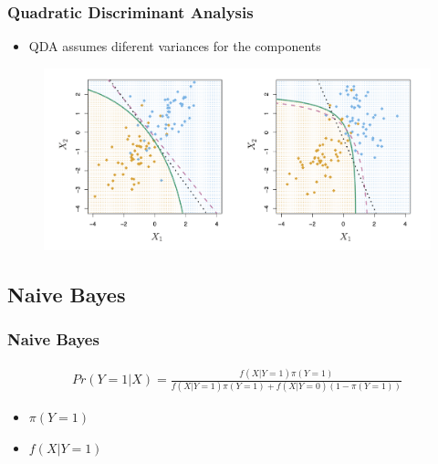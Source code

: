 \documentclass[
  shownotes,
  xcolor={svgnames},
  hyperref={colorlinks,citecolor=DarkBlue,linkcolor=andesred,urlcolor=DarkBlue}
  , aspectratio=169]{beamer}
\begin{document}
\begin{frame}[fragile]
\frametitle{Quadratic Discriminant Analysis}
\begin{itemize}
  \item QDA  assumes diferent variances for the components
\end{itemize}


\begin{figure}[H] \centering
            \captionsetup{justification=centering}
              \includegraphics[scale=0.4]{figures/QDA} 
 \end{figure}
\end{frame}
\subsection{Naive Bayes}
\begin{frame}[fragile]
\frametitle{ Naive Bayes}

\begin{align}
Pr (Y=1|X)=\frac{f(X|Y=1)\pi(Y=1)}{f(X|Y=1)\pi(Y=1) + f(X|Y=0)(1-\pi(Y=1))}
\end{align}

\begin{itemize}
  \item $\pi(Y=1)$
  \item $f(X|Y=1)$
\end{itemize}

\end{frame}
\end{document}
